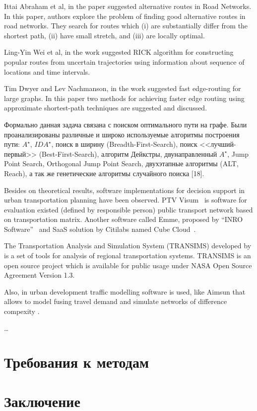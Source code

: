Ittai Abraham et al, in the paper \cite{abraham2013alternative} suggested alternative routes in Road 
Networks. In this paper, authors explore the problem of finding good alternative routes in road networks. 
They search for routes which (i) are substantially differ from the shortest path, (ii) have small stretch, 
and (iii) are locally optimal. 

Ling-Yin Wei et al, in the work \cite{wei2012constructing} suggested RICK algorithm for constructing 
popular routes from uncertain trajectories using information about sequence of locations and time 
intervals.

Tim Dwyer and Lev Nachmanson, in the work \cite{dwyer2009fast} suggested fast edge-routing for large 
graphs. In this paper two methods for achieving faster edge routing using approximate shortest-path 
techniques are suggested and discussed.

Формально данная задача связана с поиском оптимального пути на графе. Были проанализированы различные и 
широко используемые алгоритмы построения пути: \( A^\star \), \( IDA^\star \), поиск в ширину 
(Breadth-First-Search), поиск <<лучший-первый>> (Best-First-Search), алгоритм Дейкстры, двунаправленный 
\( A^\star \), Jump Point Search, Orthogonal Jump Point Search, двухэтапные алгоритмы (ALT, Reach), а 
так же генетические алгоритмы случайного поиска [18]. 

Besides on theoretical results, software implementations for decision support in urban transportation 
planning have been observed. PTV Visum~\cite{bib:6} is software for evaluation existed (defined by 
responsible person) public transport network based on transportation matrix. Another software called 
Emme, proposed by ``INRO Software''~\cite{bib:7} and SaaS solution by Citilabs named 
Cube Cloud~\cite{bib:8}.

The Transportation Analysis and Simulation System (TRANSIMS) developed by \cite{transims} is a set of 
tools for analysis of regional transportation systems. TRANSIMS is an open source project which is 
available for public usage under NASA Open Source Agreement Version 1.3.
 
Also, in urban development traffic modelling software is used, like Aimsun that allows to model fusing 
travel demand and simulate networks of difference compexity \cite{aimsun}.

\dots

\section{Требования к методам}
\section{Заключение}